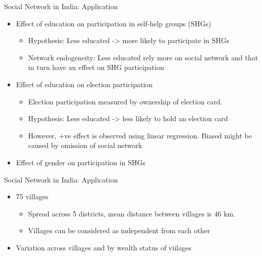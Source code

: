 \documentclass[newPxFont,numfooter,sectionpages]{beamer}
\begin{document}
\begin{frame}{Social Network in India: Application}

	\begin{itemize}
		\item Effect of education on participation in self-help groups (SHGs)

		\begin{itemize}
			\item Hypothesis: Less educated -> more likely to participate in SHGs
			\item Network endogeneity: Less educated rely more on social network and that in turn have an effect on SHG participation
		\end{itemize}		
		
		\item Effect of education on election participation 
		\begin{itemize}
			\item Election participation measured by ownership of election card. 
			\item Hypothesis: Less educated -> less likely to hold an election card
			\item However, +ve effect is observed using linear regression. Biased might be caused by omission of social network 
		\end{itemize}		

		\item Effect of gender on participation in SHGs

	\end{itemize}

\end{frame}

\begin{frame}{Social Network in India: Application}

	\begin{itemize}
		\item 75 villages

		\begin{itemize}
			\item Spread across 5 districts, mean distance between villages is 46 km.
			\item Villages can be considered as independent from each other
		\end{itemize}		
				
		\item Variation across villages and by wealth status of viilages
		
		
	\end{itemize}

\end{frame}
\end{document}
